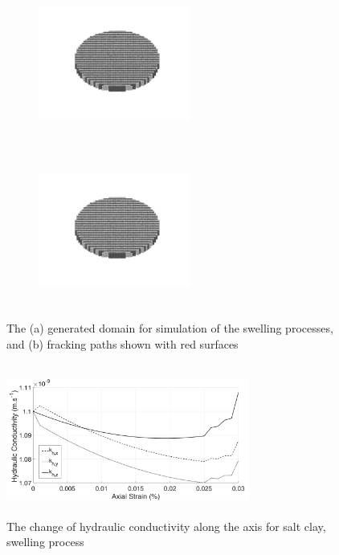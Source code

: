 \begin{figure}[!ht]
\begin{subfigure}[c]{0.5\textwidth}
\centering
\includegraphics[width=5cm,height=5cm]{figures/Amir_ME6_Lattice_Setup.png}
\subcaption{}
\label{fig:Amir_ME5_Lattice_Setup}
\end{subfigure}
\begin{subfigure}[c]{0.5\textwidth}
\centering
\includegraphics[width=5cm,height=5cm]{figures/Amir_ME6_Lattice_Setup.png}
\subcaption{}
\label{fig:Amir_ME5_Lattice_Frack}
\end{subfigure}
\caption{The (a) generated domain for simulation of the swelling processes, and (b) fracking paths shown with red surfaces}
\end{figure}


\begin{figure}[!ht]
\centering
\includegraphics[width=8cm,height=5cm]{figures/Amir_ME5_Lattice_Drying.png}
\caption{The change of hydraulic conductivity along the axis for salt clay, swelling process}
\label{fig:Amir_ME5_Lattice_Drying}
\end{figure} 



